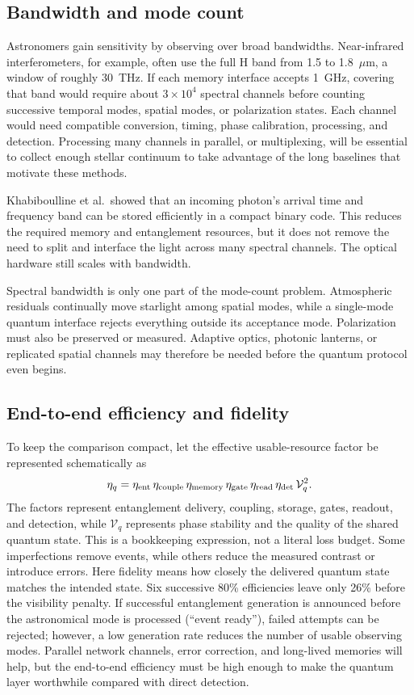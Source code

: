 \documentclass[]{spie}
\newcommand{\etal}{et al.}
\begin{document}
\subsection{Bandwidth and mode count}

Astronomers gain sensitivity by observing over broad bandwidths. Near-infrared interferometers, for example, often use the full H band from 1.5 to 1.8~$\mu$m, a window of roughly 30~THz. If each memory interface accepts 1~GHz, covering that band would require about $3\times10^4$ spectral channels before counting successive temporal modes, spatial modes, or polarization states. Each channel would need compatible conversion, timing, phase calibration, processing, and detection. Processing many channels in parallel, or multiplexing, will be essential to collect enough stellar continuum to take advantage of the long baselines that motivate these methods.

Khabiboulline \etal\ showed that an incoming photon's arrival time and frequency band can be stored efficiently in a compact binary code.\cite{Khabiboulline2019PRA} This reduces the required memory and entanglement resources, but it does not remove the need to split and interface the light across many spectral channels. The optical hardware still scales with bandwidth.

Spectral bandwidth is only one part of the mode-count problem. Atmospheric residuals continually move starlight among spatial modes, while a single-mode quantum interface rejects everything outside its acceptance mode. Polarization must also be preserved or measured. Adaptive optics, photonic lanterns, or replicated spatial channels may therefore be needed before the quantum protocol even begins.

\subsection{End-to-end efficiency and fidelity}

To keep the comparison compact, let the effective usable-resource factor be represented schematically as
\begin{equation}
    \eta_q = \eta_{\rm ent}\,\eta_{\rm couple}\,\eta_{\rm memory}\,
    \eta_{\rm gate}\,\eta_{\rm read}\,\eta_{\rm det}\,\mathcal{V}_q^2.
    \label{eq:etaq}
\end{equation}
The factors represent entanglement delivery, coupling, storage, gates, readout, and detection, while $\mathcal{V}_q$ represents phase stability and the quality of the shared quantum state. This is a bookkeeping expression, not a literal loss budget. Some imperfections remove events, while others reduce the measured contrast or introduce errors. Here fidelity means how closely the delivered quantum state matches the intended state. Six successive 80\% efficiencies leave only 26\% before the visibility penalty. If successful entanglement generation is announced before the astronomical mode is processed (``event ready''), failed attempts can be rejected; however, a low generation rate reduces the number of usable observing modes. Parallel network channels, error correction, and long-lived memories will help, but the end-to-end efficiency must be high enough to make the quantum layer worthwhile compared with direct detection.
\end{document}
